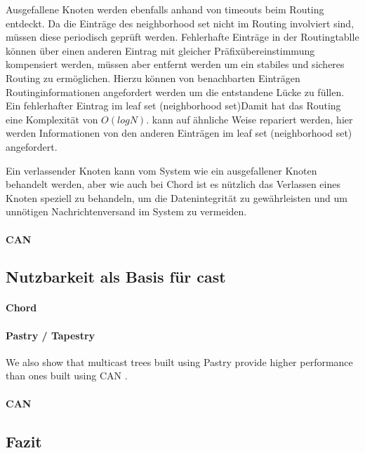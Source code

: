 Ausgefallene Knoten werden ebenfalls anhand von timeouts beim Routing entdeckt. Da die Einträge des neighborhood set nicht im Routing involviert sind, müssen diese periodisch geprüft werden. Fehlerhafte Einträge in der Routingtablle können über einen anderen Eintrag mit gleicher Präfixübereinstimmung kompensiert werden, müssen aber entfernt werden um ein stabiles und sicheres Routing zu ermöglichen. Hierzu können von benachbarten Einträgen Routinginformationen angefordert werden um die entstandene Lücke zu füllen. Ein fehlerhafter Eintrag im leaf set (neighborhood set)Damit hat das Routing eine Komplexität von $O(log N)$. kann auf ähnliche Weise repariert werden, hier werden Informationen von den anderen Einträgen im leaf set  (neighborhood set) angefordert.

Ein verlassender Knoten kann vom System wie ein ausgefallener Knoten behandelt werden, aber wie auch bei Chord ist es nützlich das Verlassen eines Knoten speziell zu behandeln, um die Datenintegrität zu gewährleisten und um unnötigen Nachrichtenversand im System zu vermeiden.

\paragraph{CAN}

\subsection{Nutzbarkeit als Basis für \ac{cast}}
\paragraph{Chord}

\paragraph{Pastry / Tapestry}
We also show that multicast trees built using Pastry provide higher performance than ones built using CAN \cite{Castro2003Evaluation, KostasKatrinis2005}.

\paragraph{CAN}
\cite{Ratnasamy2001}

\subsection{Fazit}

